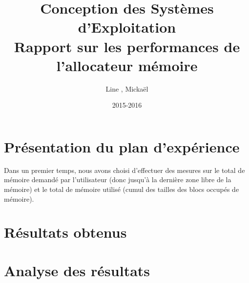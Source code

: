 \documentclass{article}
\title{Conception des Systèmes d'Exploitation\\Rapport sur les performances de l'allocateur mémoire}
\author{Line \bsc{POUVARET}, Mickaël \bsc{TURNEL}}
\date{2015-2016}
\begin{document}
\maketitle
\section{Présentation du plan d'expérience}
Dans un premier temps, nous avons choisi d'effectuer des mesures sur le total de mémoire demandé par l'utilisateur (donc jusqu'à la dernière zone libre de la mémoire) et le total de mémoire utilisé (cumul des tailles des blocs occupés de mémoire).
\section{Résultats obtenus}
 
\section{Analyse des résultats}
\end{document}
